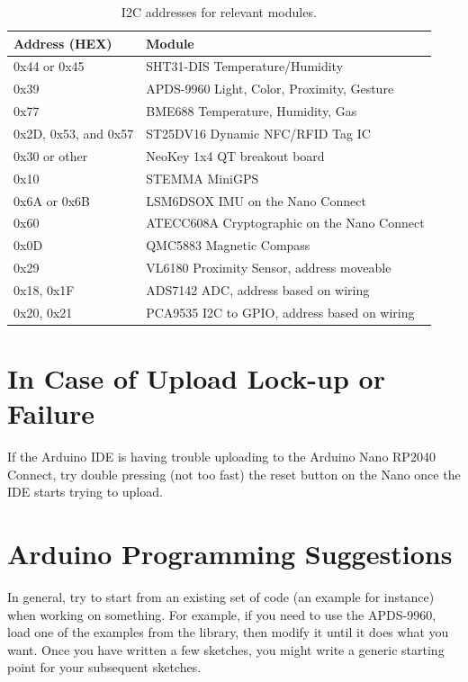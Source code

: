 \begin{table}[!ht]
	\centering
	\begin{tabular}{l l}
		\hline
		Address (HEX) & Module \\ 
		\hline
		0x44 or 0x45 & SHT31-DIS Temperature/Humidity \\
		0x39 & APDS-9960 Light, Color, Proximity, Gesture \\
		0x77 & BME688 Temperature, Humidity, Gas \\
		0x2D, 0x53, and 0x57 & ST25DV16 Dynamic NFC/RFID Tag IC \\
		0x30 or other  & NeoKey 1x4 QT breakout board \\
		0x10 & STEMMA MiniGPS \\
		0x6A or 0x6B & LSM6DSOX IMU on the Nano Connect \\
		0x60  & ATECC608A Cryptographic on the Nano Connect \\
        0x0D & QMC5883 Magnetic Compass \\
        0x29 & VL6180 Proximity Sensor, address moveable \\
        0x18, 0x1F & ADS7142 ADC, address based on wiring \\
        0x20, 0x21 & PCA9535 I2C to GPIO, address based on wiring \\
		\hline
	\end{tabular}
	\caption{I2C addresses for relevant modules.}
	\label{table:i2caddresses}
\end{table}

\section{In Case of Upload Lock-up or Failure}
If the Arduino IDE is having trouble uploading to the Arduino Nano RP2040 Connect, try double pressing
(not too fast) the reset button on the Nano once the IDE starts trying to upload.

\section{Arduino Programming Suggestions}
In general, try to start from an existing set of code (an example for instance) when working on something.
For example, if you need to use the APDS-9960, load one of the examples from the library, then modify it
until it does what you want. Once you have written a few sketches, you might write a generic starting point
for your subsequent sketches.

